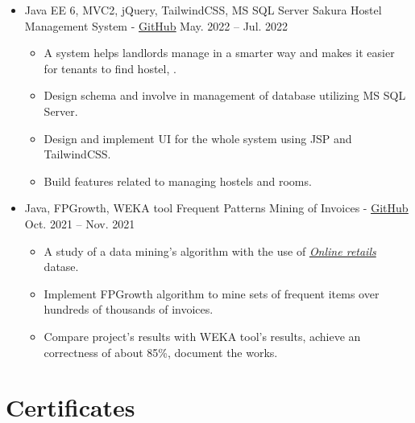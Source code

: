\documentclass[11pt,a4paper,sans]{moderncv}        %
\begin{document}
\begin{itemize}
\item{
\cventry
{}
{Java EE 6, MVC2, jQuery, TailwindCSS, MS SQL Server}
{Sakura Hostel Management System  - \href{https://github.com/dat-nguyen-304/SE1618-Dolphin}{\underline{\normalfont GitHub}}}
{May. 2022 -- Jul. 2022}
{}
{\vspace{1pt}
\begin{itemize}
\item  A system helps landlords manage in a smarter way and makes it easier for tenants to find hostel, .
\vspace{1pt}
\item  Design schema and involve in management of database utilizing MS SQL Server.
\vspace{1pt}
\item  Design and implement UI for the whole system using JSP and TailwindCSS.
\vspace{1pt}
\item  Build features related to managing hostels and rooms.
\vspace{1pt}
\end{itemize}
}}

\vspace{1.5pt}



\item{
\cventry
{}
{Java, FPGrowth, WEKA tool}
{Frequent Patterns Mining of Invoices - \href{https://github.com/locnd-172/fpgrowth-algoirthm}{\underline{\normalfont GitHub}}}
{Oct. 2021 -- Nov. 2021}
{}
{\vspace{1pt}
\begin{itemize}
\item  A study of a data mining's algorithm with the use of \href{http://archive.ics.uci.edu/ml/datasets/Online+Retail}{\textit{Online retails}} datase.
\item  Implement FPGrowth algorithm to mine sets of frequent items over hundreds of thousands of invoices.
\item  Compare project's results with WEKA tool's results, achieve an correctness of about 85\%, document the works.
\end{itemize}
}}
\end{itemize}

\vspace{-2pt}
\section{Certificates}
\end{document}
